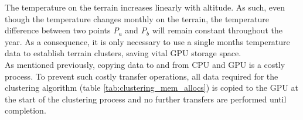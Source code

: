 The temperature on the terrain increases linearly with altitude. As such, even though the temperature changes monthly on the terrain, the temperature difference between two points \textit{P$_{a}$} and \textit{P$_{b}$} will remain constant throughout the year. As a consequence, it is only necessary to use a single months temperature data to establish terrain clusters, saving vital GPU storage space.\\

As mentioned previously, copying data to and from CPU and GPU is a costly process. To prevent such costly transfer operations, all data required for the clustering algorithm (table \ref{tab:clustering_mem_allocs}) is copied to the GPU at the start of the clustering process and no further transfers are performed until completion. \\